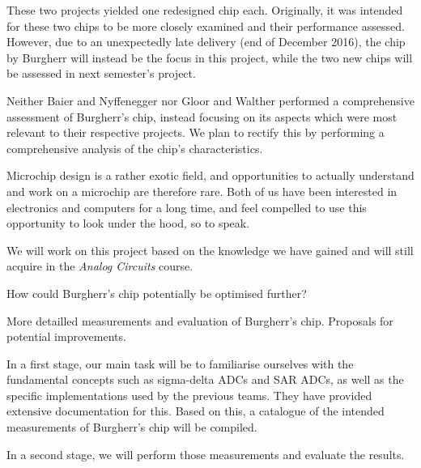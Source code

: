 \documentclass[a4paper,10pt]{article}
\begin{document}
\begin{description}[align=left]
        These two projects  yielded one redesigned chip  each.  Originally, it
        was intended for these two chips to be more closely examined and their
        performance assessed. However,  due to  an unexpectedly  late delivery
        (end of December 2016), the chip by Burgherr will instead be the focus
        in this  project, while  the two  new chips will  be assessed  in next
        semester's project.
    \item[Problem:]
        Neither  Baier  and Nyffenegger  nor  Gloor  and Walther  performed  a
        comprehensive assessment  of Burgherr's chip, instead  focusing on its
        aspects which were most relevant to their respective projects. We plan
        to rectify this  by performing a comprehensive analysis  of the chip's
        characteristics.
    \item[Personal Interest:]
        Microchip  design  is a  rather  exotic  field, and  opportunities  to
        actually understand and  work on a microchip  are therefore rare. Both
        of us  have been interested  in electronics  and computers for  a long
        time, and  feel compelled to  use this  opportunity to look  under the
        hood, so to speak.
    \item[Own theoretical position:]
        We will work on this project based on the knowledge we have gained and
        will still acquire in the \emph{Analog Circuits} course.
    \item[Question  $\ne$  Task:] How  could Burgherr's  chip  potentially  be
        optimised further?
    \item[Objectives:]
        More   detailled    measurements   and   evaluation    of   Burgherr's
        chip. Proposals for potential improvements.
    \item[Methodical Approach:]
        In a first stage, our main  task will be to familiarise ourselves with
        the fundamental  concepts such  as sigma-delta ADCs  and SAR  ADCs, as
        well as the specific implementations  used by the previous teams. They
        have  provided  extensive documentation  for  this. Based  on this,  a
        catalogue  of the  intended measurements  of Burgherr's  chip will  be
        compiled.

        In a second stage, we will perform those measurements and evaluate the
        results.


\end{description}
\end{document}
